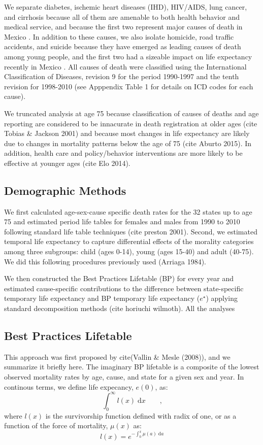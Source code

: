 \documentclass{article}
\newcommand{\dd}{\; \mathrm{d}}
\newcommand{\tc}{\quad\quad\text{,}}
\begin{document}
We separate diabetes, ischemic heart diseases (IHD), HIV/AIDS, lung
cancer, and cirrhosis because all of them are amenable to both health behavior
and medical service, and because the first two represent major causes of death
in Mexico \citep{canudas2014}. In addition to these causes, we also isolate
homicide, road traffic accidents, and suicide because they have emerged as
leading causes of death among young people, and the first two had a sizeable
impact on life expectancy recently in Mexico \citep{canudas2014}. All causes of death were classified using the International Classification of Diseases, revision 9 for the period 1990-1997 and the tenth revision for 1998-2010 (see Apppendix Table 1 for details on ICD codes for each cause).

We truncated analysis at age 75 because classification of causes of deaths and age reporting are considered to be innacurate in death registration at older ages (cite Tobias \& Jackson 2001) and because most changes in life expectancy are likely due to changes in mortality patterns below the age of 75 (cite Aburto 2015). In addition, health care and policy/behavior interventions are more likely to be effective at younger ages (cite Elo 2014).


\subsection*{Demographic Methods}
We first calculated age-sex-cause specific death rates for the 32 states up to age 75 and estimated period life tables for females and males from 1990 to 2010 following standard life table techniques (cite preston 2001). Second, we estimated temporal life expectancy to capture differential effects of the morality categories among three subgroups: child (ages 0-14), young (ages 15-40) and adult (40-75). We did this following procedures previously used (Arriaga 1984). 

We then constructed the Best Practices Lifetable (BP) for every year and estimated cause-specific contributions to the difference between state-specific temporary life expectancy and BP temporary life expectancy ($e^{\star}$) applying standard decomposition methods (cite horiuchi wilmoth). All the analyses 


\subsection*{Best Practices Lifetable}
This approach was first proposed by cite(Vallin \& Mesle (2008)), and we summarize it
briefly here. The imaginary BP lifetable is a composite
of the lowest observed mortality rates by age, cause, and state for a given sex
and year. In continous terms, we define life expecancy, $e(0)$, as:
\begin{equation}
\int _0 ^\infty l(x) \dd x \tc
\end{equation}
where $l(x)$ is the survivorship function defined with radix of one, or as a
function of the force of mortality, $\mu(x)$ as:
\begin{equation}
\label{eq:lx}
l(x) = e^{-\int_0^x \mu(a) \dd a}
\end{equation}
\end{document}
